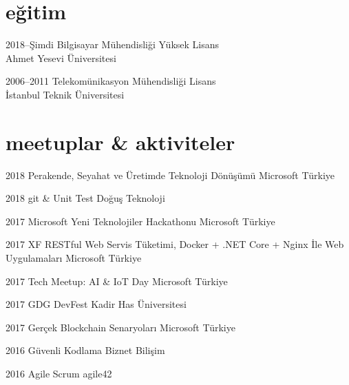 \documentclass[]{../friggeri-cv} %
\begin{document}
\section{eğitim}

\begin{entrylist}

\entry
{2018--Şimdi}
{Bilgisayar Mühendisliği}
{}
{Yüksek Lisans
\\Ahmet Yesevi Üniversitesi}

\entry
{2006--2011}
{Telekomünikasyon Mühendisliği}
{}
{Lisans
\\İstanbul Teknik Üniversitesi}
	
\end{entrylist}

\section{meetuplar \& aktiviteler}

\begin{entrylist}

\entry
{2018}
{Perakende, Seyahat ve Üretimde Teknoloji Dönüşümü}
{}
{Microsoft Türkiye}

\entry
{2018}
{git \& Unit Test}
{}
{Doğuş Teknoloji}

\entry
{2017}
{Microsoft Yeni Teknolojiler Hackathonu}
{}
{Microsoft Türkiye}

\entry
{2017}
{XF RESTful Web Servis Tüketimi, Docker + .NET Core + Nginx İle Web Uygulamaları}
{}
{Microsoft Türkiye}

\entry
{2017}
{Tech Meetup: AI \& IoT Day}
{}
{Microsoft Türkiye}

\entry
{2017}
{GDG DevFest}
{}
{Kadir Has Üniversitesi}

\entry
{2017}
{Gerçek Blockchain Senaryoları}
{}
{Microsoft Türkiye}

\entry
{2016}
{Güvenli Kodlama}
{}
{Biznet Bilişim}

\entry
{2016}
{Agile Scrum}
{}
{agile42}

\end{entrylist}
\end{document}
